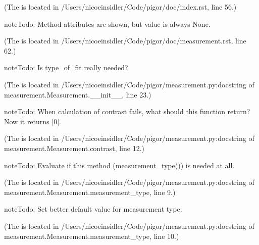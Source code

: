 \documentclass[letterpaper,10pt,english]{sphinxmanual}
\begin{document}
(The {\hyperref[\detokenize{index:index-0}]{}} is located in /Users/nicoeinsidler/Code/pigor/doc/index.rst, line 56.)

\begin{sphinxadmonition}{note}{Todo:}
Method attributes are shown, but value is always None.
\end{sphinxadmonition}

(The {\hyperref[\detokenize{measurement:index-0}]{}} is located in /Users/nicoeinsidler/Code/pigor/doc/measurement.rst, line 62.)

\begin{sphinxadmonition}{note}{Todo:}
Is type\_of\_fit really needed?
\end{sphinxadmonition}

(The {\hyperref[\detokenize{measurement:index-1}]{}} is located in /Users/nicoeinsidler/Code/pigor/measurement.py:docstring of measurement.Measurement.\_\_init\_\_, line 23.)

\begin{sphinxadmonition}{note}{Todo:}
When calculation of contrast fails, what should this function return? Now it returns {[}0{]}.
\end{sphinxadmonition}

(The {\hyperref[\detokenize{measurement:index-2}]{}} is located in /Users/nicoeinsidler/Code/pigor/measurement.py:docstring of measurement.Measurement.contrast, line 12.)

\begin{sphinxadmonition}{note}{Todo:}
Evaluate if this method (measurement\_type()) is needed at all.
\end{sphinxadmonition}

(The {\hyperref[\detokenize{measurement:index-3}]{}} is located in /Users/nicoeinsidler/Code/pigor/measurement.py:docstring of measurement.Measurement.measurement\_type, line 9.)

\begin{sphinxadmonition}{note}{Todo:}
Set better default value for measurement type.
\end{sphinxadmonition}

(The {\hyperref[\detokenize{measurement:index-4}]{}} is located in /Users/nicoeinsidler/Code/pigor/measurement.py:docstring of measurement.Measurement.measurement\_type, line 10.)
\end{document}
